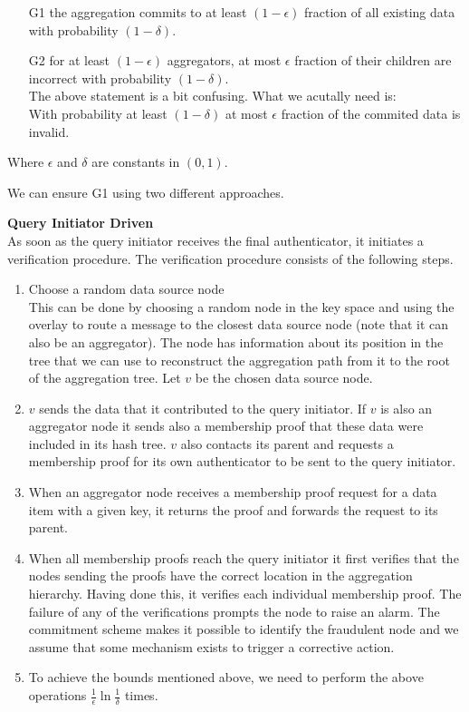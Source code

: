 \documentclass{article}
\begin{document}
\begin{itemize}
\item [G1] the aggregation commits to at least $(1-\epsilon)$ fraction of
  all existing data with probability $(1-\delta)$.
\item [G2] for at least $(1-\epsilon)$ aggregators, at most $\epsilon$
  fraction of their children are incorrect with probability
  $(1-\delta)$. \\
The above statement is a bit confusing. What we acutally need is:\\
With probability at least $(1-\delta)$ at most $\epsilon$ fraction of
  the commited data is invalid.

 
\end{itemize}

Where $\epsilon$ and $\delta$ are constants in $(0,1)$. 

We can ensure G1 using two different approaches.

{\bf Query Initiator Driven}\\
As soon as the query initiator receives the final
authenticator, it initiates a verification procedure. The verification
procedure consists of the following steps.

\begin{enumerate}
\item Choose a random data source node\\
This can be done by choosing a random node in the key space and using
the overlay to route a message to the closest data source node (note
that it can also be an aggregator). The node has information about its
position in the tree that we can use to reconstruct the aggregation
path from it to the root of the aggregation tree. Let $v$ be the
chosen data source node. 

\item $v$ sends the data that it contributed to the query
  initiator. If $v$ is also an aggregator node it sends also a
  membership proof that these data were included in its hash tree. $v$
  also contacts its parent and requests a membership proof for its own
  authenticator to be sent to the query initiator.

\item When an aggregator node receives a membership proof request for
  a data item with a given key, it returns the proof and forwards the
  request to its parent.

\item When all membership proofs reach the query initiator it first
  verifies that the nodes sending the proofs have the correct location
  in the aggregation hierarchy. Having done this, it verifies each
  individual membership proof. The failure of any of the verifications
  prompts the node to raise an alarm. The commitment scheme makes it
  possible to identify the fraudulent node and we assume that some
  mechanism exists to trigger a corrective action. 

\item To achieve the bounds mentioned above, we need to perform the
  above operations $\frac{1}{\epsilon}\ln{\frac{1}{\delta}}$ times. 
\end{enumerate}
\end{document}

